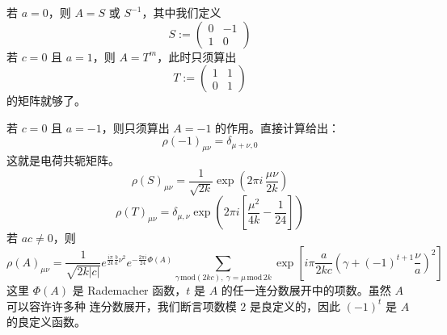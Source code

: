 若 $a=0$，则 $A=S$ 或 $S^{-1}$，其中我们定义
\begin{equation}
  S := \begin{pmatrix} 0 & -1\\ 1 & 0\end{pmatrix}
  \tag{D.11}
  \label{eq:D.11}
\end{equation}
若 $c=0$ 且 $a=1$，则 $A=T^m$，此时只须算出
\begin{equation}
  T := \begin{pmatrix} 1 & 1\\ 0 & 1\end{pmatrix}
  \tag{D.12}
  \label{eq:D.12}
\end{equation}
的矩阵就够了。

若 $c=0$ 且 $a=-1$，则只须算出 $A=-1$ 的作用。直接计算给出：
\begin{equation}
  \rho(-1)_{\mu\nu} = \delta_{\mu+\nu,0}
  \tag{D.13}
  \label{eq:D.13}
\end{equation}
这就是电荷共轭矩阵。
\begin{equation}
  \rho(S)_{\mu\nu} = \frac{1}{\sqrt{2k}}\exp\left(2\pi i\,\frac{\mu\nu}{2k}\right)
  \tag{D.14}
  \label{eq:D.14}
\end{equation}
\begin{equation}
  \rho(T)_{\mu\nu} = \delta_{\mu,\nu}\exp\left(2\pi i\left[\frac{\mu^2}{4k}-\frac{1}{24}\right]\right)
  \tag{D.15}
  \label{eq:D.15}
\end{equation}
若 $ac\ne 0$，则
\begin{equation}
  \rho(A)_{\mu\nu} = \frac{1}{\sqrt{2k|c|}}
  e^{\frac{i\pi}{2k}\frac{b}{a}\nu^2}
  e^{-\frac{2\pi i}{24}\Phi(A)}
  \sum_{\gamma\,\mathrm{mod}(2kc),\ \gamma=\mu\,\mathrm{mod}\,2k}
  \exp\left[i\pi\frac{a}{2kc}\left(\gamma+(-1)^{t+1}\frac{\nu}{a}\right)^2\right]
  \tag{D.16}
  \label{eq:D.16}
\end{equation}
这里 $\Phi(A)$ 是 Rademacher 函数，$t$ 是 $A$ 的任一连分数展开中的项数。虽然 $A$ 可以容许许多种
连分数展开，我们断言项数模 $2$ 是良定义的，因此 $(-1)^t$ 是 $A$ 的良定义函数。


